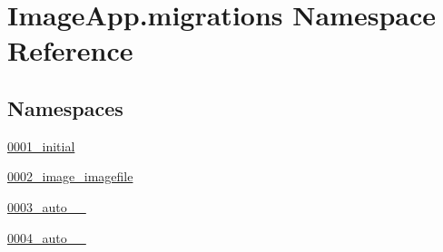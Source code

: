 \hypertarget{namespace_image_app_1_1migrations}{}\section{Image\+App.\+migrations Namespace Reference}
\label{namespace_image_app_1_1migrations}
\subsection*{Namespaces}
\begin{DoxyCompactItemize}
\item 
 \mbox{\hyperlink{namespace_image_app_1_1migrations_1_10001__initial}{0001\+\_\+initial}}
\item 
 \mbox{\hyperlink{namespace_image_app_1_1migrations_1_10002__image__imagefile}{0002\+\_\+image\+\_\+imagefile}}
\item 
 \mbox{\hyperlink{namespace_image_app_1_1migrations_1_10003__auto__20180818__1425}{0003\+\_\+auto\+\_\+\_}}
\item 
 \mbox{\hyperlink{namespace_image_app_1_1migrations_1_10004__auto__20180819__1722}{0004\+\_\+auto\+\_\+\_}}
\end{DoxyCompactItemize}
